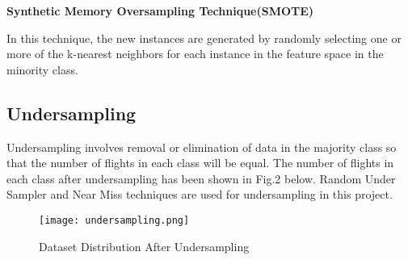 \documentclass[12pt,letter-paper]{article}
\begin{document}
        \item\textbf{Synthetic Memory Oversampling Technique(SMOTE)}
            
            In this technique, the new instances are generated by randomly selecting one or more of the k-nearest neighbors for each instance in the feature space in the minority class.
        
    \subsection{Undersampling}
    
    Undersampling involves removal or elimination of data in the majority class so that the number of flights in each class will be equal. The number of flights in each class after undersampling has been shown in Fig.2 below. Random Under Sampler and Near Miss techniques are used for undersampling in this project.
        \begin{figure}[H]%
            \begin{center}
                \texttt{[image: undersampling.png]}%
                    \caption{Dataset Distribution After Undersampling}  
            \end{center}
        \end{figure}
        
\end{document}
